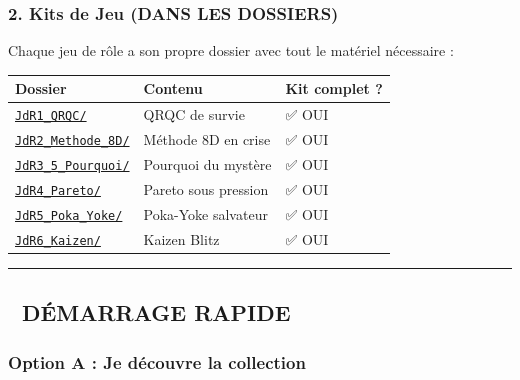 \documentclass[
]{article}
\begin{document}
\subsubsection{2. Kits de Jeu (DANS LES
DOSSIERS)}\label{kits-de-jeu-dans-les-dossiers}

Chaque jeu de rôle a son propre dossier avec tout le matériel nécessaire
:

\begin{longtable}[]{@{}
  >{\raggedright\arraybackslash}p{}
  >{\raggedright\arraybackslash}p{}
  >{\raggedright\arraybackslash}p{}@{}}
\toprule\noalign{}
\begin{minipage}[b]{\linewidth}\raggedright
Dossier
\end{minipage} & \begin{minipage}[b]{\linewidth}\raggedright
Contenu
\end{minipage} & \begin{minipage}[b]{\linewidth}\raggedright
Kit complet ?
\end{minipage} \\
\midrule\noalign{}
\endhead
\bottomrule\noalign{}
\endlastfoot
\href{./JdR1_QRQC/}{\texttt{JdR1\_QRQC/}} & QRQC de survie & ✅ OUI \\
\href{./JdR2_Methode_8D/}{\texttt{JdR2\_Methode\_8D/}} & Méthode 8D en
crise & ✅ OUI \\
\href{./JdR3_5_Pourquoi/}{\texttt{JdR3\_5\_Pourquoi/}} & 5 Pourquoi du
mystère & ✅ OUI \\
\href{./JdR4_Pareto/}{\texttt{JdR4\_Pareto/}} & Pareto sous pression &
✅ OUI \\
\href{./JdR5_Poka_Yoke/}{\texttt{JdR5\_Poka\_Yoke/}} & Poka-Yoke
salvateur & ✅ OUI \\
\href{./JdR6_Kaizen/}{\texttt{JdR6\_Kaizen/}} & Kaizen Blitz & ✅ OUI \\
\end{longtable}

\begin{center}\rule{0.5\linewidth}{0.5pt}\end{center}

\subsection{🚀 DÉMARRAGE RAPIDE}\label{duxe9marrage-rapide}

\subsubsection{Option A : Je découvre la
collection}\label{option-a-je-duxe9couvre-la-collection}
\end{document}
